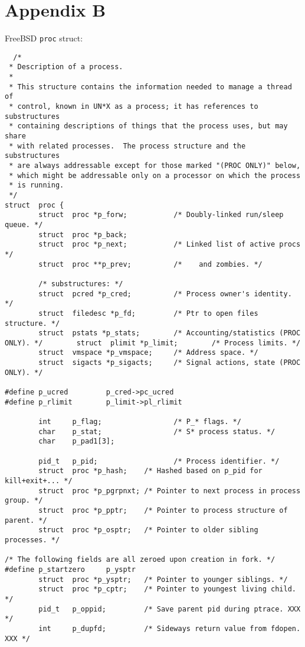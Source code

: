 \documentclass[10pt,letterpaper,onecolumn,draftclsnofoot]{IEEEtran}
\begin{document}
\section{Appendix B}
FreeBSD \texttt{proc} struct: \cite{freebsdstruct2016}
\begin{lstlisting}
  /*
 * Description of a process.
 *
 * This structure contains the information needed to manage a thread of
 * control, known in UN*X as a process; it has references to substructures
 * containing descriptions of things that the process uses, but may share
 * with related processes.  The process structure and the substructures
 * are always addressable except for those marked "(PROC ONLY)" below,
 * which might be addressable only on a processor on which the process
 * is running.
 */
struct  proc {
        struct  proc *p_forw;           /* Doubly-linked run/sleep queue. */
        struct  proc *p_back;
        struct  proc *p_next;           /* Linked list of active procs */
        struct  proc **p_prev;          /*    and zombies. */

        /* substructures: */
        struct  pcred *p_cred;          /* Process owner's identity. */
        struct  filedesc *p_fd;         /* Ptr to open files structure. */
        struct  pstats *p_stats;        /* Accounting/statistics (PROC ONLY). */        struct  plimit *p_limit;        /* Process limits. */
        struct  vmspace *p_vmspace;     /* Address space. */
        struct  sigacts *p_sigacts;     /* Signal actions, state (PROC ONLY). */

#define p_ucred         p_cred->pc_ucred
#define p_rlimit        p_limit->pl_rlimit

        int     p_flag;                 /* P_* flags. */
        char    p_stat;                 /* S* process status. */
        char    p_pad1[3];

        pid_t   p_pid;                  /* Process identifier. */
        struct  proc *p_hash;    /* Hashed based on p_pid for kill+exit+... */
        struct  proc *p_pgrpnxt; /* Pointer to next process in process group. */
        struct  proc *p_pptr;    /* Pointer to process structure of parent. */
        struct  proc *p_osptr;   /* Pointer to older sibling processes. */

/* The following fields are all zeroed upon creation in fork. */
#define p_startzero     p_ysptr
        struct  proc *p_ysptr;   /* Pointer to younger siblings. */
        struct  proc *p_cptr;    /* Pointer to youngest living child. */
        pid_t   p_oppid;         /* Save parent pid during ptrace. XXX */
        int     p_dupfd;         /* Sideways return value from fdopen. XXX */


\end{lstlisting}
\end{document}
